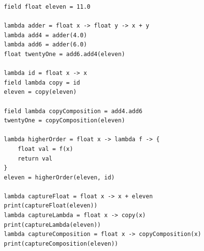 \begin{lstlisting}[emph={field,float,lambda,return,print},emphstyle={\textbf},caption={The syntax of lambda expressions in \emph{Scandal}.},label={alg:lambdas}]
field float eleven = 11.0

lambda adder = float x -> float y -> x + y
lambda add4 = adder(4.0)
lambda add6 = adder(6.0)
float twentyOne = add6.add4(eleven)

lambda id = float x -> x
field lambda copy = id
eleven = copy(eleven)

field lambda copyComposition = add4.add6
twentyOne = copyComposition(eleven)

lambda higherOrder = float x -> lambda f -> {
	float val = f(x)
	return val
}
eleven = higherOrder(eleven, id)

lambda captureFloat = float x -> x + eleven
print(captureFloat(eleven))
lambda captureLambda = float x -> copy(x)
print(captureLambda(eleven))
lambda captureComposition = float x -> copyComposition(x)
print(captureComposition(eleven))
\end{lstlisting}

